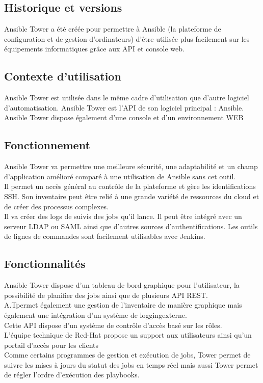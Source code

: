 \documentclass[12pt]{article}
\begin{document}
\subsection{Historique et versions}
Ansible Tower a été créée pour permettre à Ansible (la plateforme de configuration et de gestion d’ordinateurs) d’être utilisée plus facilement sur les équipements informatiques grâce aux API et console web.

\subsection{Contexte d'utilisation}
Ansible Tower est utilisée dans le même cadre d'utilisation que d'autre logiciel d'automatisation. Ansible Tower est l'API de son logiciel principal : Ansible. 
\\
Ansible Tower dispose également d'une console et d'un environnement WEB

\subsection{Fonctionnement}
Ansible Tower va permettre une meilleure sécurité, une adaptabilité et un champ d’application amélioré comparé à une utilisation de Ansible sans cet outil. 
\\
Il permet un accès général au contrôle de la plateforme et gère les identifications SSH. Son inventaire peut être relié à une grande variété de ressources du cloud et de créer des processus complexes. 
\\
Il va créer des logs de suivis des jobs qu'il lance. Il peut être intégré avec un serveur LDAP ou SAML ainsi que d’autres sources d’authentifications. Les outils de lignes de commandes sont facilement utilisables avec Jenkins.

\subsection{Fonctionnalités}
Ansible Tower dispose d'un tableau de bord graphique pour l'utilisateur, la possibilité de planifier des jobs ainsi que de plusieurs API REST. 
\\
A.T\footnotemark[1] permet également une gestion de l'inventaire de manière graphique mais également une intégration d'un système de logging\footnotemark[2] externe.
\\
Cette API dispose d'un système de contrôle d'accès basé sur les rôles.
\\
L'équipe technique de Red-Hat propose un support aux utilisateurs ainsi qu'un portail d'accès pour les clients
\\
Comme certains programmes de gestion et exécution de jobs, Tower permet de suivre les mises à jours du statut des jobs en temps réel mais aussi Tower permet de régler l'ordre d'exécution des playbooks.
\end{document}

